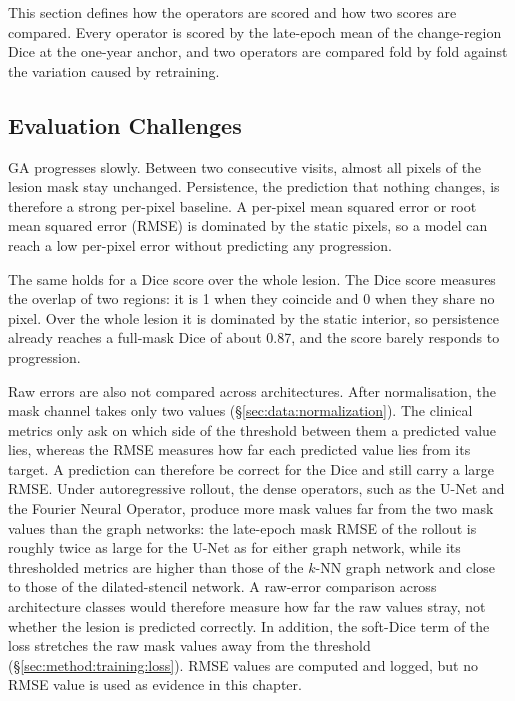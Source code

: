 This section defines how the operators are scored and how two scores are
compared. Every operator is scored by the late-epoch mean of the
change-region Dice at the one-year anchor, and two operators are compared
fold by fold against the variation caused by retraining.

\subsection{Evaluation Challenges}
\label{sec:experiments:protocol:mse}

GA progresses slowly. Between two consecutive visits, almost all pixels of
the lesion mask stay unchanged. Persistence, the prediction that nothing
changes, is therefore a strong per-pixel baseline. A per-pixel mean squared
error or root mean squared error (RMSE) is dominated by the static pixels,
so a model can reach a low per-pixel error without predicting any
progression.

The same holds for a Dice score over the whole lesion. The Dice score
measures the overlap of two regions: it is 1 when they coincide and 0 when
they share no pixel. Over the whole lesion it is dominated by the static
interior, so persistence already reaches a full-mask Dice of about 0.87,
and the score barely responds to progression.

Raw errors are also not compared across architectures. After
normalisation, the mask channel takes only two values
(\S\ref{sec:data:normalization}). The clinical metrics only ask on which
side of the threshold between them a predicted value lies, whereas the
RMSE measures how far each predicted value lies from its target. A
prediction can therefore be correct for the Dice and still carry a large
RMSE. Under autoregressive rollout, the dense operators, such as the U-Net
and the Fourier Neural Operator, produce more mask values far from the two
mask values than the graph networks: the late-epoch mask RMSE of the rollout
is roughly twice as large for the U-Net as for either graph network, while
its thresholded metrics are higher than those of the $k$-NN graph network
and close to those of the dilated-stencil network. A raw-error comparison across architecture
classes would therefore measure how far the raw values stray, not whether
the lesion is predicted correctly. In
addition, the soft-Dice term of the loss stretches the raw mask values away
from the threshold (\S\ref{sec:method:training:loss}). RMSE values are
computed and logged, but no RMSE value is used as evidence in this chapter.

